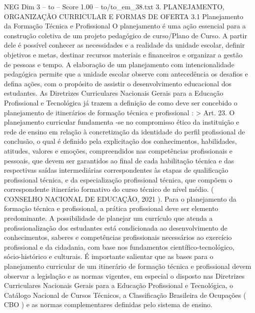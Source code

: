 \begin{textsample}{NEG Dim 3 – to – Score 1.00 – to/to\_em\_38.txt}  \label{ex:f3_neg_185}
3.
PLANEJAMENTO, ORGANIZAÇÃO CURRICULAR E FORMAS DE OFERTA 3.1 Planejamento da Formação Técnica e Profissional O planejamento é uma ação essencial para a construção coletiva de um projeto pedagógico de curso/Plano de Curso.
A partir dele é possível conhecer as necessidades e a realidade da unidade escolar, definir objetivos e metas, destinar recursos materiais e financeiros e organizar a gestão de pessoas e tempo.
A elaboração de um planejamento com intencionalidade pedagógica permite que a unidade escolar observe com antecedência os desafios e defina ações, com o propósito de assistir o desenvolvimento educacional dos estudantes.
As Diretrizes Curriculares Nacionais Gerais para a Educação Profissional e Tecnológica já trazem a definição de como deve ser concebido o planejamento de itinerários de formação técnica e profissional : > Art. 23.
O planejamento curricular fundamenta -se no compromisso ético da instituição e rede de ensino em relação à concretização da identidade do perfil profissional de conclusão, o qual é definido pela explicitação dos conhecimentos, habilidades, atitudes, valores e emoções, compreendidos nas competências profissionais e pessoais, que devem ser garantidos ao final de cada habilitação técnica e das respectivas saídas intermediárias correspondentes às etapas de qualificação profissional técnica, e da especialização profissional técnica, que compõem o correspondente itinerário formativo do curso técnico de nível médio. ( CONSELHO NACIONAL DE EDUCAÇÃO, 2021 ).
Para o planejamento da formação técnica e profissional, a prática profissional deve ser elemento predominante.
A possibilidade de planejar um currículo que atenda a profissionalização dos estudantes está condicionada ao desenvolvimento de conhecimentos, saberes e competências profissionais necessários ao exercício profissional e da cidadania, com base nos fundamentos científico-tecnológico, sócio-histórico e culturais.
É importante salientar que as bases para o planejamento curricular de um itinerário de formação técnica e profissional devem observar a legislação e as normas vigentes, em especial o disposto nas Diretrizes Curriculares Nacionais Gerais para a Educação Profissional e Tecnológica, o Catálogo Nacional de Cursos Técnicos, a Classificação Brasileira de Ocupações ( CBO ) e as normas complementares definidas pelo sistema de ensino.

\end{textsample}
